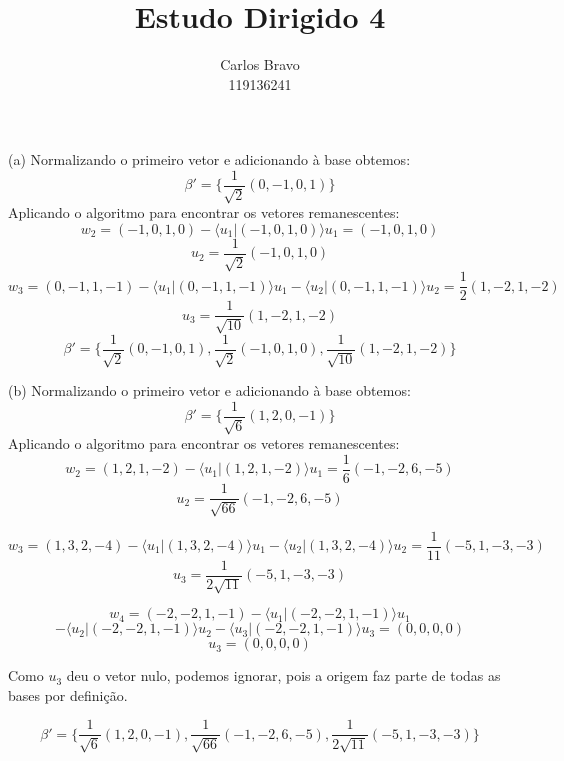 \documentclass{homework}
\title{Estudo Dirigido 4}
\author{Carlos Bravo\\ 119136241}
\begin{document}
\maketitle

\exercise*
(a) Normalizando o primeiro vetor e adicionando à base obtemos:
\[\beta'= \{\frac{1}{\sqrt{2}}(0,-1,0,1)\}\]
Aplicando o algoritmo para encontrar os vetores remanescentes:
\[w_2 = (-1,0,1,0) - \langle u_1|(-1,0,1,0)\rangle u_1 = (-1,0,1,0)\]
\[u_2 = \frac{1}{\sqrt{2}}(-1,0,1,0)\]
\[w_3 = (0,-1,1,-1) - \langle u_1|(0,-1,1,-1)\rangle u_1 - \langle u_2|(0,-1,1,-1)\rangle u_2 = \frac{1}{2}(1,-2,1,-2)\]
\[u_3 = \frac{1}{\sqrt{10}}(1,-2,1,-2)\]
\[\beta'= \{\frac{1}{\sqrt{2}}(0,-1,0,1),\frac{1}{\sqrt{2}}(-1,0,1,0),\frac{1}{\sqrt{10}}(1,-2,1,-2)\}\]

(b) Normalizando o primeiro vetor e adicionando à base obtemos:
\[\beta'= \{\frac{1}{\sqrt{6}}(1,2,0,-1)\}\]
Aplicando o algoritmo para encontrar os vetores remanescentes:
\[w_2 = (1,2,1,-2) - \langle u_1|(1,2,1,-2)\rangle u_1 = \frac{1}{6}(-1,-2,6,-5)\]
\[u_2 = \frac{1}{\sqrt{66}}(-1,-2,6,-5)\]

\[w_3 = (1,3,2,-4) - \langle u_1|(1,3,2,-4)\rangle u_1 - \langle u_2|(1,3,2,-4)\rangle u_2 = \frac{1}{11}(-5,1,-3,-3)\]
\[u_3 = \frac{1}{2\sqrt{11}}(-5,1,-3,-3)\]

\[w_4 = (-2,-2,1,-1) - \langle u_1|(-2,-2,1,-1)\rangle u_1 \]
\[- \langle u_2|(-2,-2,1,-1)\rangle u_2 - \langle u_3|(-2,-2,1,-1)\rangle u_3 = (0,0,0,0)\]
\[u_3 = (0,0,0,0)\]

Como $u_3$ deu o vetor nulo, podemos ignorar, pois a origem faz parte de todas as bases por definição.

\[\beta'= \{\frac{1}{\sqrt{6}}(1,2,0,-1),\frac{1}{\sqrt{66}}(-1,-2,6,-5),\frac{1}{2\sqrt{11}}(-5,1,-3,-3)\}\]
\end{document}

